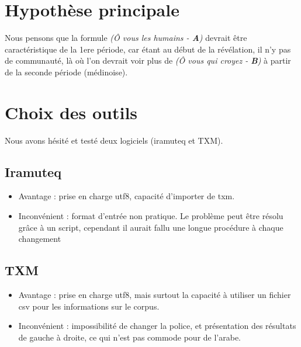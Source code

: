 \documentclass[a4paper,11pt]{report}
\begin{document}
\section{Hypothèse principale}
\label{sec-1-2}

Nous pensons que la formule \emph{(Ô vous les humains - \textbf{A})} devrait être caractéristique de la 1ere période, car étant au début de la révélation, il n'y pas de communauté, là où l'on devrait voir plus de \emph{(Ô vous qui croyez - \textbf{B})} à partir de la seconde période (médinoise). \\

\section{Choix des outils}
\label{sec-1-3}

Nous avons hésité et testé deux logiciels (iramuteq et TXM). \\

\subsection{Iramuteq}
\label{sec-1-3-1}

\begin{itemize}
\item Avantage : prise en charge utf8, capacité d'importer de txm. \\
\item Inconvénient : format d'entrée non pratique. Le problème peut être résolu grâce à un script, cependant il aurait fallu une longue procédure à chaque changement \\
\end{itemize}


\subsection{TXM}
\label{sec-1-3-2}

\begin{itemize}
\item Avantage : prise en charge utf8, mais surtout la capacité à utiliser un fichier csv pour les informations sur le corpus. \\
\item Inconvénient : impossibilité de changer la police, et présentation des résultats de gauche à droite, ce qui n'est pas commode pour de l'arabe. \\
\end{itemize}
\end{document}
